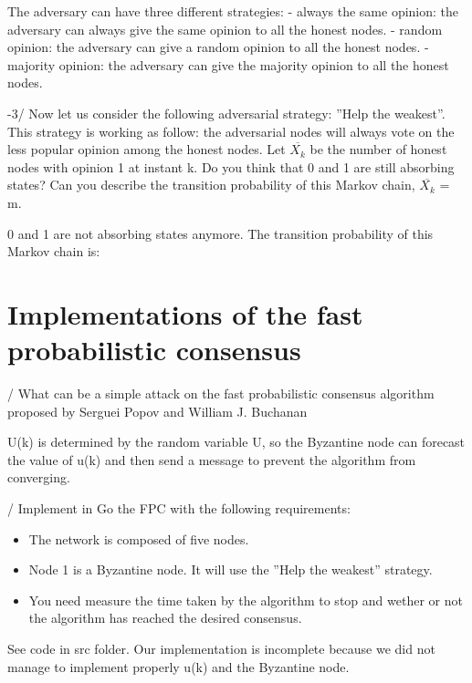 \documentclass[11pt]{article}
\begin{document}
\vspace{5mm}

The adversary can have three different strategies:
- always the same opinion: the adversary can always give the same opinion to all the honest nodes. 
- random opinion: the adversary can give a random opinion to all the honest nodes.
- majority opinion: the adversary can give the majority opinion to all the honest nodes.

\vspace{5mm}

-3/ Now let us consider the following adversarial strategy: ”Help the weakest”. This strategy is
working as follow: the adversarial nodes will always vote on the less popular opinion among
the honest nodes. Let $\overline{X_{k}}$ be the number of honest nodes with opinion 1 at instant k. Do you
think that 0 and 1 are still absorbing states? Can you describe the transition probability of this
Markov chain, $\overline{X_{k}}$ = m.

\vspace{5mm}

0 and 1 are not absorbing states anymore. The transition probability of this Markov chain is:


\vspace{10mm}

\section{Implementations of the fast probabilistic consensus}

\vspace{5mm}

/ What can be a simple attack on the fast probabilistic consensus algorithm proposed
by Serguei Popov and William J. Buchanan

\vspace{5mm}

U(k) is determined by the random variable U, so the Byzantine node can forecast the value of u(k) and then send a message to prevent the algorithm from converging.

\vspace{5mm}

/ Implement in Go the FPC with the following requirements:
\begin{itemize}
    \item The network is composed of five nodes.
    \item Node 1 is a Byzantine node. It will use the ”Help the weakest” strategy.
    \item You need measure the time taken by the algorithm to stop and wether or not the algorithm has
    reached the desired consensus.
\end{itemize}

\vspace{5mm}

\noindent See code in src folder. Our implementation is incomplete because we did not manage to implement properly u(k) and the Byzantine node.




\end{document}
